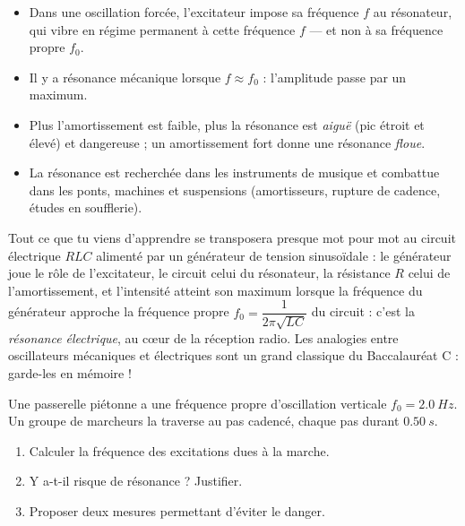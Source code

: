 \documentclass[11pt]{article}
\newcommand{\cle}[1]{{\popxbold\color{popdark}#1}}
\begin{document}
\begin{aretenir}
\begin{itemize}
\item Dans une oscillation forcée, l'\cle{excitateur} impose sa fréquence $f$ au \cle{résonateur}, qui vibre en régime permanent à cette fréquence $f$ — et non à sa fréquence propre $f_0$.
\item Il y a \cle{résonance mécanique} lorsque $f \approx f_0$ : l'amplitude passe par un maximum.
\item Plus l'amortissement est faible, plus la résonance est \emph{aiguë} (pic étroit et élevé) et dangereuse ; un amortissement fort donne une résonance \emph{floue}.
\item La résonance est recherchée dans les instruments de musique et combattue dans les ponts, machines et suspensions (amortisseurs, rupture de cadence, études en soufflerie).
\end{itemize}
\end{aretenir}

\begin{savaistu}
Tout ce que tu viens d'apprendre se transposera presque mot pour mot au circuit électrique $RLC$ alimenté par un générateur de tension sinusoïdale : le générateur joue le rôle de l'excitateur, le circuit celui du résonateur, la résistance $R$ celui de l'amortissement, et l'intensité atteint son maximum lorsque la fréquence du générateur approche la fréquence propre $f_0 = \dfrac{1}{2\pi\sqrt{LC}}$ du circuit : c'est la \emph{résonance électrique}, au cœur de la réception radio. Les analogies entre oscillateurs mécaniques et électriques sont un grand classique du Baccalauréat C : garde-les en mémoire !
\end{savaistu}

\begin{exercice}
Une passerelle piétonne a une fréquence propre d'oscillation verticale $f_0 = \SI{2,0}{Hz}$. Un groupe de marcheurs la traverse au pas cadencé, chaque pas durant $\SI{0,50}{s}$.
\begin{enumerate}
\item Calculer la fréquence des excitations dues à la marche.
\item Y a-t-il risque de résonance ? Justifier.
\item Proposer deux mesures permettant d'éviter le danger.
\end{enumerate}
\end{exercice}
\end{document}
